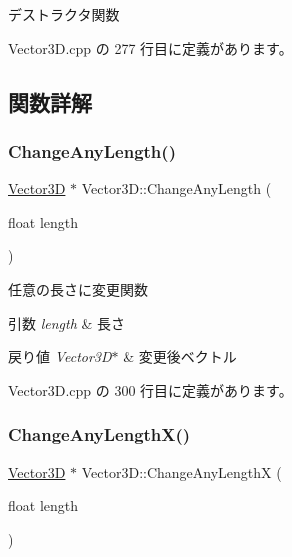 デストラクタ関数 



 Vector3\+D.\+cpp の 277 行目に定義があります。



\subsection{関数詳解}
\mbox{\label{class_vector3_d_a3972641a984580d5dc12d219ab6c1ffe}} 
\subsubsection{\texorpdfstring{Change\+Any\+Length()}{ChangeAnyLength()}}
{\footnotesize\ttfamily \mbox{\hyperlink{class_vector3_d}{Vector3D}} $\ast$ Vector3\+D\+::\+Change\+Any\+Length (\begin{DoxyParamCaption}\item[{float}]{length }\end{DoxyParamCaption})}



任意の長さに変更関数 


\begin{DoxyParams}{引数}
{\em length} & 長さ \\
\hline
\end{DoxyParams}

\begin{DoxyRetVals}{戻り値}
{\em Vector3\+D$\ast$} & 変更後ベクトル \\
\hline
\end{DoxyRetVals}


 Vector3\+D.\+cpp の 300 行目に定義があります。

\mbox{\label{class_vector3_d_a3a28833aece711a085634cd98e5c6d74}} 
\subsubsection{\texorpdfstring{Change\+Any\+Length\+X()}{ChangeAnyLengthX()}}
{\footnotesize\ttfamily \mbox{\hyperlink{class_vector3_d}{Vector3D}} $\ast$ Vector3\+D\+::\+Change\+Any\+LengthX (\begin{DoxyParamCaption}\item[{float}]{length }\end{DoxyParamCaption})}



